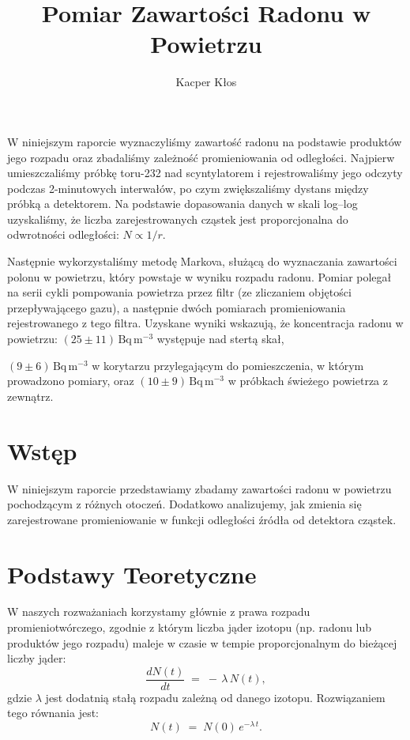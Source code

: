 \documentclass[12pt]{article}
\title{Pomiar Zawartości Radonu w Powietrzu}
\author{Kacper Kłos}
\begin{document}
\maketitle

W niniejszym raporcie wyznaczyliśmy zawartość radonu na podstawie produktów jego rozpadu oraz zbadaliśmy zależność promieniowania od odległości. Najpierw umieszczaliśmy próbkę toru-232 nad scyntylatorem i rejestrowaliśmy jego odczyty podczas 2-minutowych interwałów, po czym zwiększaliśmy dystans między próbką a detektorem. Na podstawie dopasowania danych w skali log–log uzyskaliśmy, że liczba zarejestrowanych cząstek jest proporcjonalna do odwrotności odległości: \(N \propto 1/r\).

Następnie wykorzystaliśmy metodę Markova, służącą do wyznaczania zawartości polonu w powietrzu, który powstaje w wyniku rozpadu radonu. Pomiar polegał na serii cykli pompowania powietrza przez filtr (ze zliczaniem objętości przepływającego gazu), a następnie dwóch pomiarach promieniowania rejestrowanego z tego filtra. Uzyskane wyniki wskazują, że koncentracja radonu w powietrzu: \((25 \pm 11)\,\mathrm{Bq\,m^{-3}}\) występuje nad stertą skał, 

\((9 \pm 6)\,\mathrm{Bq\,m^{-3}}\) w korytarzu przylegającym do pomieszczenia, w którym prowadzono pomiary, oraz \((10 \pm 9)\,\mathrm{Bq\,m^{-3}}\) w próbkach świeżego powietrza z zewnątrz.


\newpage

\section{Wstęp}
W niniejszym raporcie przedstawiamy zbadamy zawartości radonu w powietrzu pochodzącym z różnych otoczeń. Dodatkowo analizujemy, jak zmienia się zarejestrowane promieniowanie w funkcji odległości źródła od detektora cząstek.

\section{Podstawy Teoretyczne}
W naszych rozważaniach korzystamy głównie z prawa rozpadu promieniotwórczego, zgodnie z którym liczba jąder izotopu (np. radonu lub produktów jego rozpadu) maleje w czasie w tempie proporcjonalnym do bieżącej liczby jąder:
\[
\frac{dN(t)}{dt} \;=\; -\,\lambda\,N(t),
\]
gdzie \(\lambda\) jest dodatnią stałą rozpadu zależną od danego izotopu. Rozwiązaniem tego równania jest:
\begin{equation}
	N(t) \;=\; N(0)\,e^{-\lambda\,t}.
	\label{eq:decay}
\end{equation}
\end{document}
